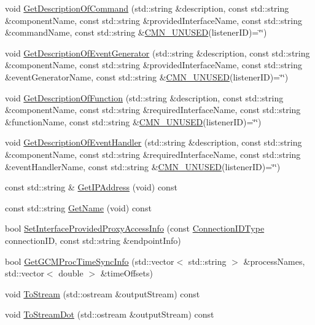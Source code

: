 \begin{DoxyCompactItemize}
\item 
void \hyperlink{classmts_manager_local_aa23c882a4d8d12a41c30f6c2e4f008f6}{Get\-Description\-Of\-Command} (std\-::string \&description, const std\-::string \&component\-Name, const std\-::string \&provided\-Interface\-Name, const std\-::string \&command\-Name, const std\-::string \&\hyperlink{cmn_portability_8h_a021894e2626935fa2305434b1e893ff6}{C\-M\-N\-\_\-\-U\-N\-U\-S\-E\-D}(listener\-I\-D)=\char`\"{}\char`\"{})
\item 
void \hyperlink{classmts_manager_local_ab59bb1e128336eb5ef2bcfed753352c3}{Get\-Description\-Of\-Event\-Generator} (std\-::string \&description, const std\-::string \&component\-Name, const std\-::string \&provided\-Interface\-Name, const std\-::string \&event\-Generator\-Name, const std\-::string \&\hyperlink{cmn_portability_8h_a021894e2626935fa2305434b1e893ff6}{C\-M\-N\-\_\-\-U\-N\-U\-S\-E\-D}(listener\-I\-D)=\char`\"{}\char`\"{})
\item 
void \hyperlink{classmts_manager_local_a277e517a00d781ffe9153bf78ae817ee}{Get\-Description\-Of\-Function} (std\-::string \&description, const std\-::string \&component\-Name, const std\-::string \&required\-Interface\-Name, const std\-::string \&function\-Name, const std\-::string \&\hyperlink{cmn_portability_8h_a021894e2626935fa2305434b1e893ff6}{C\-M\-N\-\_\-\-U\-N\-U\-S\-E\-D}(listener\-I\-D)=\char`\"{}\char`\"{})
\item 
void \hyperlink{classmts_manager_local_a2ea56cf917075a58150ac8b301042427}{Get\-Description\-Of\-Event\-Handler} (std\-::string \&description, const std\-::string \&component\-Name, const std\-::string \&required\-Interface\-Name, const std\-::string \&event\-Handler\-Name, const std\-::string \&\hyperlink{cmn_portability_8h_a021894e2626935fa2305434b1e893ff6}{C\-M\-N\-\_\-\-U\-N\-U\-S\-E\-D}(listener\-I\-D)=\char`\"{}\char`\"{})
\item 
const std\-::string \& \hyperlink{classmts_manager_local_adedc9380e7d4563616b271782c04bc6b}{Get\-I\-P\-Address} (void) const 
\item 
const std\-::string \hyperlink{classmts_manager_local_ad8b2c443fc9321e94436a94644818cb5}{Get\-Name} (void) const 
\item 
bool \hyperlink{classmts_manager_local_a70ff8c90812c66e14c6ab0c7c9dfe5a4}{Set\-Interface\-Provided\-Proxy\-Access\-Info} (const \hyperlink{mts_forward_declarations_8h_ad3543bb11742e1766374ec96016d6547}{Connection\-I\-D\-Type} connection\-I\-D, const std\-::string \&endpoint\-Info)
\item 
bool \hyperlink{classmts_manager_local_a367eb7f1d24a84fa9e0e22623444acb8}{Get\-G\-C\-M\-Proc\-Time\-Sync\-Info} (std\-::vector$<$ std\-::string $>$ \&process\-Names, std\-::vector$<$ double $>$ \&time\-Offsets)
\item 
void \hyperlink{classmts_manager_local_aa81364a745fce38a9e924cb09c6166d7}{To\-Stream} (std\-::ostream \&output\-Stream) const 
\item 
void \hyperlink{classmts_manager_local_a29f68a2770a88fe6a2cfd7a0cbdabe14}{To\-Stream\-Dot} (std\-::ostream \&output\-Stream) const 
\end{DoxyCompactItemize}
